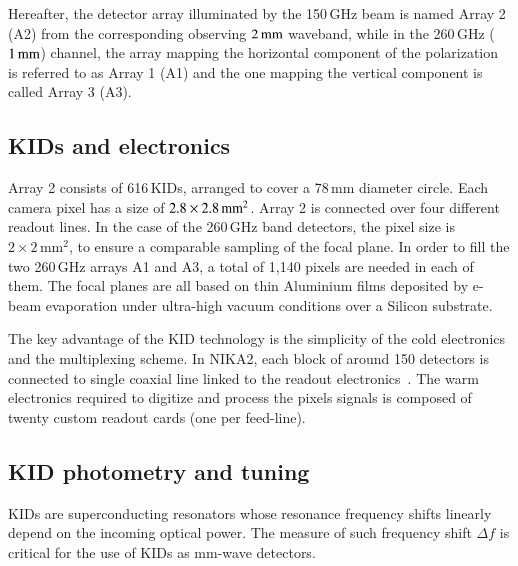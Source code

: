 Hereafter, the detector array illuminated by the 150\,GHz beam is named Array
2 (A2) from the corresponding observing $2\, \rm{mm}$ waveband,
while in the 260\,GHz ($1\, \rm{mm}$) channel, the array mapping the
horizontal component of the polarization is referred to as Array 1 (A1)
and the one mapping the vertical component is called Array 3 (A3). 

\subsection{KIDs and electronics}
\label{se:array}

Array 2 consists of 616\,KIDs, arranged to cover a 78\,mm diameter
circle. Each camera pixel has a size of
$2.8\times2.8\textrm{\,mm}^2$. Array 2 is connected over four different
readout lines. In the case of the 260\,GHz band detectors, the pixel size is
$2\times 2\mathrm{\,mm}^2$, to ensure a comparable sampling of the focal
plane. In order to fill the two 260\,GHz arrays A1 and A3, a total of
1,140 pixels are needed in each of them. The focal planes are all
based on thin Aluminium films deposited by e-beam evaporation under
ultra-high vacuum conditions over a Silicon substrate.

The key advantage of the KID technology is the simplicity of the cold
electronics and the multiplexing scheme. In NIKA2, each block of around 150
detectors is connected to single coaxial line linked to the readout
electronics~\citep{Bourrion2016}.
The warm electronics required to digitize
and process the pixels signals is composed of twenty custom readout
cards (one per feed-line).

\subsection{KID photometry and tuning}
\label{se:tuning}

KIDs are superconducting resonators whose resonance
frequency shifts linearly depend on the incoming optical power. The
measure of such frequency shift $\Delta f$ is critical for the use of
KIDs as mm-wave detectors. 

